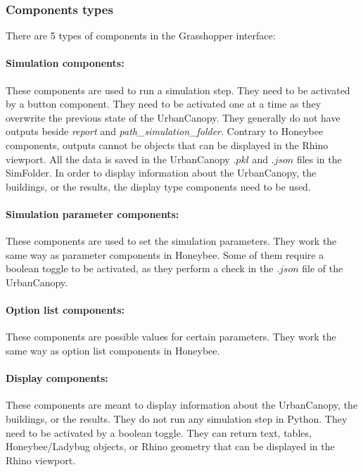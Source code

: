 \documentclass[a4paper,12pt]{article} %
\begin{document}
    \subsubsection{Components types}
    \label{subsubsec:components-types}
    There are 5 types of components in the Grasshopper interface:
    \paragraph{Simulation components:} These components are used to run a simulation step.
    They need to be activated by a button component.
    They need to be activated one at a time as they overwrite the previous state of the \gls{UrbanCanopy}.
    They generally do not have outputs beside \textit{report} and \textit{path\_simulation\_folder}.
    Contrary to Honeybee components, outputs cannot be objects that can be displayed in the Rhino viewport.
    All the data is saved in the \gls{UrbanCanopy} $.pkl$ and $.json$ files in the \gls{SimFolder}.
    In order to display information about the \gls{UrbanCanopy}, the buildings, or the results, the display type components need to be used.

    \paragraph{Simulation parameter components:} These components are used to set the simulation parameters.
    They work the same way as parameter components in Honeybee.
    Some of them require a boolean toggle to be activated, as they perform a check in the $.json$ file of the \gls{UrbanCanopy}.

    \paragraph{Option list components:} These components are possible values for certain parameters.
    They work the same way as option list components in Honeybee.

    \paragraph{Display components:} These components are meant to display information about the \gls{UrbanCanopy}, the buildings, or the results.
    They do not run any simulation step in Python.
    They need to be activated by a boolean toggle.
    They can return text, tables, Honeybee/Ladybug objects, or Rhino geometry that can be displayed in the Rhino viewport.
\end{document}

